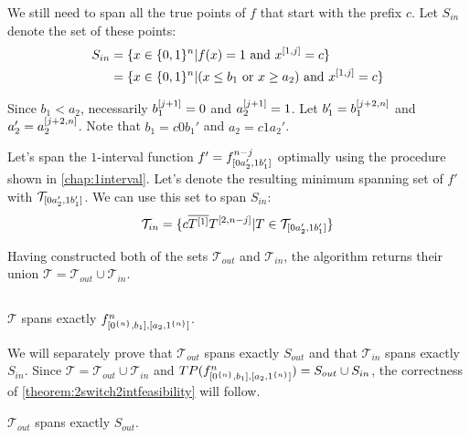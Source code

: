 \begin{description}
We still need to span all the true points of $f$
that start with the prefix $c$.
Let $S_{in}$ denote the set of these points:
\begin{align*}
S_{in}
&= \{x \in \{0, 1\}^n
| f(x) = 1 \text{ and } x^{[1, j]} = c\} \\
&= \{x \in \{0, 1\}^n
| (x \leq b_1 \text{ or } x \geq a_2) \text{ and } x^{[1, j]} = c\}
\end{align*}

Since $b_1 < a_2$,
necessarily $b_1^{[j+1]} = 0$ and $a_2^{[j+1]} = 1$.
Let $b_1' = b_1^{[j+2, n]}$
and $a_2' = a_2^{[j+2, n]}$.
Note that $b_1 = c 0 b_1'$ and $a_2 = c 1 a_2'$.

Let's
span the $1$-interval function
$f' = f^{n-j}_{[0 a_2', 1 b_1']}$
optimally using the procedure shown in \cref{chap:1interval}.
Let's denote the resulting minimum spanning set of $f'$
with $\mathcal{T}_{[0 a_2', 1 b_1']}$.
We can use this set to span $S_{in}$:
$$
\mathcal{T}_{in} =
\{c \overline{T^{[1]}} T^{[2, n-j]}
| T \in \mathcal{T}_{[0 a_2', 1 b_1']}\}
$$

Having constructed both of the sets
$\mathcal{T}_{out}$ and $\mathcal{T}_{in}$,
the algorithm returns their union
$\mathcal{T} = \mathcal{T}_{out} \cup \mathcal{T}_{in}$.
\end{description}

\subsection{\titlefeasibility}

\begin{theorem}
\label{theorem:2switch2intfeasibility}
$\mathcal{T}$ spans exactly $f^{n}_{[0^{\{n\}}, b_1], [a_2, 1^{\{n\}}]}$.
\end{theorem}

We will separately prove that $\mathcal{T}_{out}$ spans exactly $S_{out}$
and that $\mathcal{T}_{in}$ spans exactly $S_{in}$.
Since $\mathcal{T} = \mathcal{T}_{out} \cup \mathcal{T}_{in}$
and $TP(f^{n}_{[0^{\{n\}}, b_1], [a_2, 1^{\{n\}}]}) = S_{out} \cup S_{in}$,
the correctness of
\cref{theorem:2switch2intfeasibility} will follow.

\begin{lemma}
$\mathcal{T}_{out}$ spans exactly $S_{out}$.
\end{lemma}

